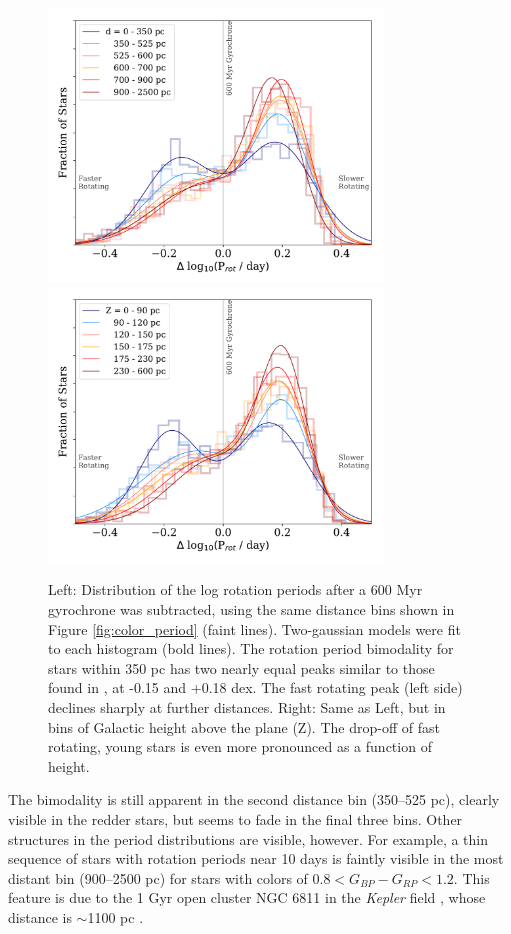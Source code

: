 \documentclass[preprint2]{aastex62}
\newcommand{\Kepler}{\textsl{Kepler}\xspace}
\begin{document}
\begin{figure}[!ht]
\centering
\includegraphics[width=3.5in]{../figures/delta_per_2gauss}
\includegraphics[width=3.5in]{../figures/delta_per_2gauss_Z}
\caption{Left: Distribution of the log rotation periods after a 600 Myr gyrochrone was subtracted, using the same distance bins shown in Figure \ref{fig:color_period} (faint lines). Two-gaussian models were fit to each histogram (bold lines). 
The rotation period bimodality for stars within 350 pc has two nearly equal peaks similar to those found in \citet{davenport2017}, at -0.15 and +0.18 dex. The fast rotating peak (left side) declines sharply at further distances.
Right: Same as Left, but in bins of Galactic height above the plane (Z). The drop-off of fast rotating, young stars is even more pronounced as a function of height.
}
\label{fig:per_hist}
\end{figure}


The bimodality is still apparent in the second distance bin (350--525 pc), clearly visible in the redder stars, but seems to fade in the final three bins. Other structures in the period distributions are visible, however. For example, a thin sequence of stars with rotation periods near 10 days is faintly visible in the most distant bin (900--2500 pc) for stars with colors of $0.8<G_{BP}-G_{RP}<1.2$. This feature is due to the 1 Gyr open cluster NGC 6811 in the \Kepler field \citep{meibom2011}, whose distance is $\sim$1100 pc \citep{sandquist2016}.
\end{document}
